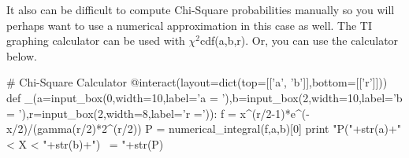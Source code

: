 \documentclass[10pt,]{book}
\numberwithin{equation}{section}
\begin{document}
%
\par
\hypertarget{p-1205}{}%
It also can be difficult to compute Chi-Square probabilities manually so you will perhaps want to use a numerical approximation in this case as well. The TI graphing calculator can be used with \(\chi ^2\)cdf(a,b,r).  Or, you can use the calculator below.%
\par
\hypertarget{p-1206}{}%
\leavevmode%
\begin{sageinput}
# Chi-Square Calculator
@interact(layout=dict(top=[['a', 'b']],bottom=[['r']]))
def _(a=input_box(0,width=10,label='a = '),b=input_box(2,width=10,label='b = '),r=input_box(2,width=8,label='r =')):
    f = x^(r/2-1)*e^(-x/2)/(gamma(r/2)*2^(r/2))
    P = numerical_integral(f,a,b)[0]
    print "P("+str(a)+" < X < "+str(b)+") ~= "+str(P)
\end{sageinput}
%
%
%
\typeout{************************************************}
\typeout{************************************************}
%
\end{document}
